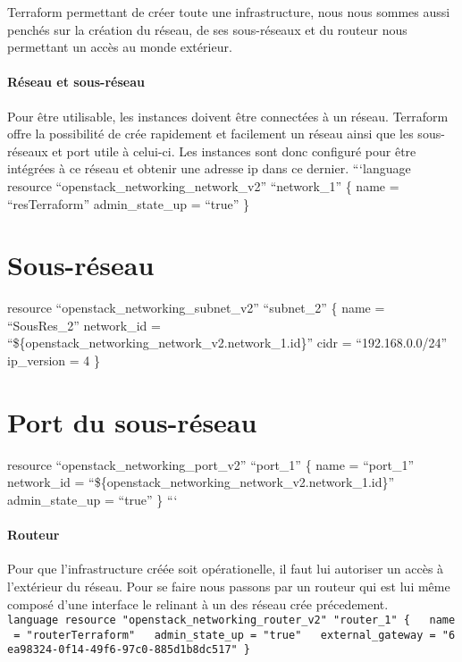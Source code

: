 \documentclass[]{article}
\let\oldparagraph\paragraph
\renewcommand{\paragraph}[1]{\oldparagraph{#1}\mbox{}}
\begin{document}
Terraform permettant de créer toute une infrastructure, nous nous sommes
aussi penchés sur la création du réseau, de ses sous-réseaux et du
routeur nous permettant un accès au monde extérieur.

\paragraph{Réseau et sous-réseau}\label{ruxe9seau-et-sous-ruxe9seau}

Pour être utilisable, les instances doivent être connectées à un réseau.
Terraform offre la possibilité de crée rapidement et facilement un
réseau ainsi que les sous-réseaux et port utile à celui-ci. Les
instances sont donc configuré pour être intégrées à ce réseau et obtenir
une adresse ip dans ce dernier. ```language resource
``openstack\_networking\_network\_v2'' ``network\_1'' \{ name =
``resTerraform'' admin\_state\_up = ``true'' \}

\section{Sous-réseau}\label{sous-ruxe9seau}

resource ``openstack\_networking\_subnet\_v2'' ``subnet\_2'' \{ name =
``SousRes\_2'' network\_id =
``\$\{openstack\_networking\_network\_v2.network\_1.id\}'' cidr =
``192.168.0.0/24'' ip\_version = 4 \}

\section{Port du sous-réseau}\label{port-du-sous-ruxe9seau}

resource ``openstack\_networking\_port\_v2'' ``port\_1'' \{ name =
``port\_1'' network\_id =
``\$\{openstack\_networking\_network\_v2.network\_1.id\}''
admin\_state\_up = ``true'' \} ```

\paragraph{Routeur}\label{routeur}

Pour que l'infrastructure créée soit opérationelle, il faut lui
autoriser un accès à l'extérieur du réseau. Pour se faire nous passons
par un routeur qui est lui même composé d'une interface le relinant à un
des réseau crée précedement.
\texttt{language\ resource\ "openstack\_networking\_router\_v2"\ "router\_1"\ \{\ \ \ name\ =\ "routerTerraform"\ \ \ admin\_state\_up\ =\ "true"\ \ \ external\_gateway\ =\ "6ea98324-0f14-49f6-97c0-885d1b8dc517"\ \}}
\end{document}
